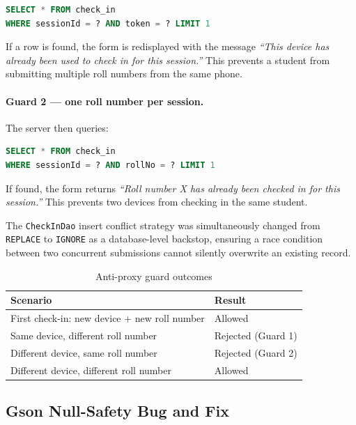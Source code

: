 \documentclass[sigconf,nonacm]{acmart}
\begin{document}
\begin{lstlisting}[language=SQL]
SELECT * FROM check_in
WHERE sessionId = ? AND token = ? LIMIT 1
\end{lstlisting}

If a row is found, the form is redisplayed with the message
\emph{``This device has already been used to check in for this
session.''} This prevents a student from submitting multiple roll
numbers from the same phone.

\paragraph{Guard 2 --- one roll number per session.}
The server then queries:

\begin{lstlisting}[language=SQL]
SELECT * FROM check_in
WHERE sessionId = ? AND rollNo = ? LIMIT 1
\end{lstlisting}

If found, the form returns \emph{``Roll number X has already been
checked in for this session.''} This prevents two devices from
checking in the same student.

The \texttt{CheckInDao} insert conflict strategy was simultaneously
changed from \texttt{REPLACE} to \texttt{IGNORE} as a database-level
backstop, ensuring a race condition between two concurrent submissions
cannot silently overwrite an existing record.

\begin{table}[h]
\caption{Anti-proxy guard outcomes}
\label{tab:guards}
\begin{tabular}{ll}
\toprule
Scenario & Result \\
\midrule
First check-in: new device + new roll number   & Allowed \\
Same device, different roll number             & Rejected (Guard 1) \\
Different device, same roll number             & Rejected (Guard 2) \\
Different device, different roll number        & Allowed \\
\bottomrule
\end{tabular}
\end{table}

\subsection{Gson Null-Safety Bug and Fix}
\label{sec:gson-bug}
\end{document}
